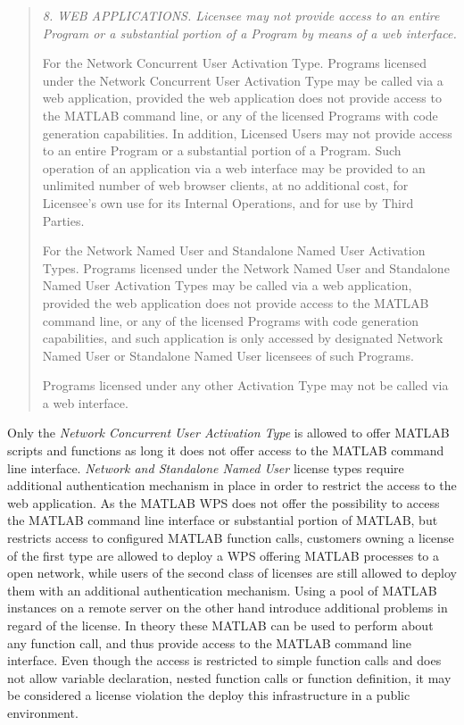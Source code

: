 		\begin{quote}\itshape\small
			8. WEB APPLICATIONS.  Licensee may not provide access to an entire Program or a substantial portion of a Program by means of a web interface.

			For the Network Concurrent User Activation Type.  Programs licensed under the Network Concurrent User Activation Type may be called via a web application, provided the web application does not provide access to the MATLAB command line, or any of the licensed Programs with code generation capabilities.  In addition, Licensed Users may not provide access to an entire Program or a substantial portion of a Program.  Such operation of an application via a web interface may be provided to an unlimited number of web browser clients, at no additional cost, for Licensee's own use for its Internal Operations, and for use by Third Parties.

			For the Network Named User and Standalone Named User Activation Types. Programs licensed under the Network Named User and Standalone Named User Activation Types may be called via a web application, provided the web application does not provide access to the MATLAB command line, or any of the licensed Programs with code generation capabilities, and such application is only accessed by designated Network Named User or Standalone Named User licensees of such Programs.

			Programs licensed under any other Activation Type may not be called via a web interface.
		\end{quote}

		Only the \emph{Network Concurrent User Activation Type} is allowed to offer MATLAB scripts and functions as long it does not offer access to the MATLAB command line interface. \emph{Network and Standalone Named User} license types require additional authentication mechanism in place in order to restrict the access to the web application. As the MATLAB WPS does not offer the possibility to access the MATLAB command line interface or substantial portion of MATLAB, but restricts access to configured MATLAB function calls, customers owning a license of the first type are allowed to deploy a \ac{WPS} offering MATLAB processes to a open network, while users of the second class of licenses are still allowed to deploy them with an additional authentication mechanism. Using a pool of MATLAB instances on a remote server on the other hand introduce additional problems in regard of the license. In theory these MATLAB can be used to perform about any function call, and thus provide access to the MATLAB command line interface. Even though the access is restricted to simple function calls and does not allow variable declaration, nested function calls or function definition, it may be considered a license violation the deploy this infrastructure in a public environment.

